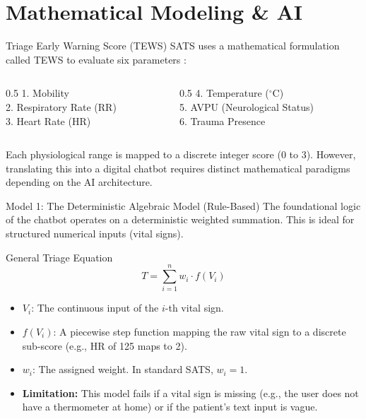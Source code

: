 \documentclass[aspectratio=169]{beamer}
\begin{document}
\section{Mathematical Modeling \& AI}

\begin{frame}{Triage Early Warning Score (TEWS)}
	SATS uses a mathematical formulation called TEWS to evaluate six parameters \cite{SATS2012}:
	\vspace{0.2cm}
	\begin{columns}
		\begin{column}{0.5\textwidth}
			1. Mobility\\
			2. Respiratory Rate (RR)\\
			3. Heart Rate (HR)
		\end{column}
		\begin{column}{0.5\textwidth}
			4. Temperature ($^\circ$C)\\
			5. AVPU (Neurological Status)\\
			6. Trauma Presence
		\end{column}
	\end{columns}
	\vspace{0.3cm}
	Each physiological range is mapped to a discrete integer score (0 to 3). However, translating this into a digital chatbot requires distinct mathematical paradigms depending on the AI architecture.
\end{frame}

\begin{frame}{Model 1: The Deterministic Algebraic Model (Rule-Based)}
	The foundational logic of the chatbot operates on a deterministic weighted summation. This is ideal for structured numerical inputs (vital signs).
	
	\begin{block}{General Triage Equation}
		\begin{equation}
			T = \sum_{i=1}^{n} w_i \cdot f(V_i)
		\end{equation}
	\end{block}
	
	\begin{itemize}
		\item $V_i$: The continuous input of the $i$-th vital sign.
		\item $f(V_i)$: A piecewise step function mapping the raw vital sign to a discrete sub-score (e.g., HR of 125 maps to 2).
		\item $w_i$: The assigned weight. In standard SATS, $w_i = 1$.
		\item \textbf{Limitation:} This model fails if a vital sign is missing (e.g., the user does not have a thermometer at home) or if the patient's text input is vague.
	\end{itemize}
\end{frame}
\end{document}
